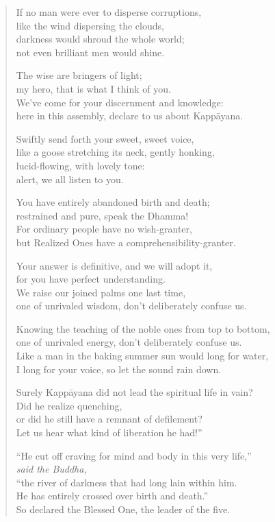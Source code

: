 \documentclass[12pt,openany]{book}%
\newcommand*{\scspeaker}[1]{\hspace{2em}\textit{#1}}
\begin{document}
\begin{verse}
If no man were ever to disperse corruptions, \\
like the wind dispersing the clouds, \\
darkness would shroud the whole world; \\
not even brilliant men would shine. 

The wise are bringers of light; \\
my hero, that is what I think of you. \\
We’ve come for your discernment and knowledge: \\
here in this assembly, declare to us about \textsanskrit{Kappāyana}. 

Swiftly send forth your sweet, sweet voice, \\
like a goose stretching its neck, gently honking, \\
lucid-flowing, with lovely tone: \\
alert, we all listen to you. 

You have entirely abandoned birth and death; \\
restrained and pure, speak the Dhamma! \\
For ordinary people have no wish-granter, \\
but Realized Ones have a comprehensibility-granter. 

Your answer is definitive, and we will adopt it, \\
for you have perfect understanding. \\
We raise our joined palms one last time, \\
one of unrivaled wisdom, don’t deliberately confuse us. 

Knowing the teaching of the noble ones from top to bottom, \\
one of unrivaled energy, don’t deliberately confuse us. \\
Like a man in the baking summer sun would long for water, \\
I long for your voice, so let the sound rain down. 

Surely \textsanskrit{Kappāyana} did not lead the spiritual life in vain? \\
Did he realize quenching, \\
or did he still have a remnant of defilement? \\
Let us hear what kind of liberation he had!” 

“He cut off craving for mind and body in this very life,” \\
\scspeaker{said the Buddha, }\\
“the river of darkness that had long lain within him. \\
He has entirely crossed over birth and death.” \\
So declared the Blessed One, the leader of the five. 


\end{verse}
\end{document}

